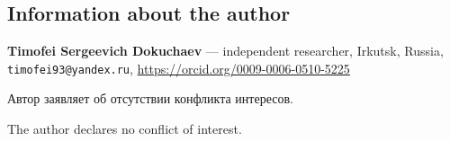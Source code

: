 \documentclass[11pt,a4paper]{article}
\theoremstyle{plain}
\theoremstyle{remark}
\begin{document}
\begin{otherlanguage}{english}
\section*{Information about the author}
\noindent\textbf{Timofei Sergeevich Dokuchaev} ---
independent researcher, Irkutsk, Russia,\\
\texttt{timofei93@yandex.ru}, \url{https://orcid.org/0009-0006-0510-5225}
\end{otherlanguage}

\medskip
\noindent Автор заявляет об отсутствии конфликта интересов.

\begin{otherlanguage}{english}
\noindent The author declares no conflict of interest.
\end{otherlanguage}
\end{document}
